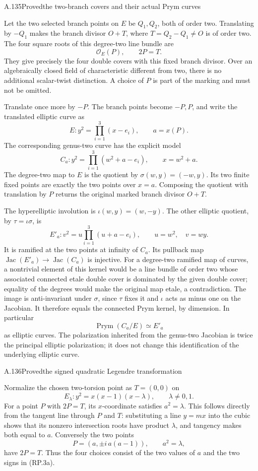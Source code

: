 \begin{statement}{A.135}{Proved}{the two-branch covers and their actual Prym curves}
\end{statement}
Let the two selected branch points on $E$ be $Q_1,Q_2$,
both of order two. Translating by $-Q_1$ makes the
branch divisor $O+T$, where $T=Q_2-Q_1\ne O$ is of
order two. The four square roots of this degree-two
line bundle are
\[
                \mathcal O_E(P),\qquad 2P=T.
 \tag{RP.2a}
\]
They give precisely the four double covers with this
fixed branch divisor. Over an algebraically closed
field of characteristic different from two, there is
no additional scalar-twist distinction. A choice of
$P$ is part of the marking and must not be omitted.

Translate once more by $-P$. The branch points become
$-P,P$, and write the translated elliptic curve as
\[
 E:y^2=\prod_{i=1}^3(x-e_i),\qquad a=x(P).
\]
The corresponding genus-two curve has the explicit model
\[
 C_a:y^2=\prod_{i=1}^3(w^2+a-e_i),\qquad x=w^2+a.
 \tag{RP.2b}
\]
The degree-two map to $E$ is the quotient by
$\sigma(w,y)=(-w,y)$. Its two finite fixed points
are exactly the two points over $x=a$. Composing
the quotient with translation by $P$ returns the
original marked branch divisor $O+T$.

The hyperelliptic involution is
$\iota(w,y)=(w,-y)$. The other elliptic quotient,
by $\tau=\iota\sigma$, is
\[
 E'_a:v^2=u\prod_{i=1}^3(u+a-e_i),\qquad
                       u=w^2,\quad v=wy.
 \tag{RP.2c}
\]
It is ramified at the two points at infinity of $C_a$.
Its pullback map $\operatorname{Jac}(E'_a)\to
\operatorname{Jac}(C_a)$ is injective. For a degree-two
ramified map of curves, a nontrivial element of this
kernel would be a line bundle of order two whose
associated connected etale double cover is dominated
by the given double cover; equality of the degrees
would make the original map etale, a contradiction.
The image is anti-invariant under $\sigma$, since
$\tau$ fixes it and $\iota$ acts as minus one on the
Jacobian. It therefore equals the connected Prym
kernel, by dimension. In particular
\[
           \operatorname{Prym}(C_a/E)\simeq E'_a
 \tag{RP.2d}
\]
as elliptic curves. The polarization inherited from
the genus-two Jacobian is twice the principal
elliptic polarization; it does not change this
identification of the underlying elliptic curve.

\begin{statement}{A.136}{Proved}{the signed quadratic Legendre transformation}
\end{statement}
Normalize the chosen two-torsion point as $T=(0,0)$ on
\[
       E_\lambda:y^2=x(x-1)(x-\lambda),\qquad
       \lambda\ne0,1.
\]
For a point $P$ with $2P=T$, its $x$-coordinate satisfies
$a^2=\lambda$. This follows directly from the tangent
line through $P$ and $T$: substituting a line $y=mx$
into the cubic shows that its nonzero intersection
roots have product $\lambda$, and tangency makes both
equal to $a$. Conversely the two points
\[
        P=(a,\pm i\,a(a-1)),\qquad a^2=\lambda,
 \tag{RP.3a}
\]
have $2P=T$. Thus the four choices consist of the two
values of $a$ and the two signs in (RP.3a).

